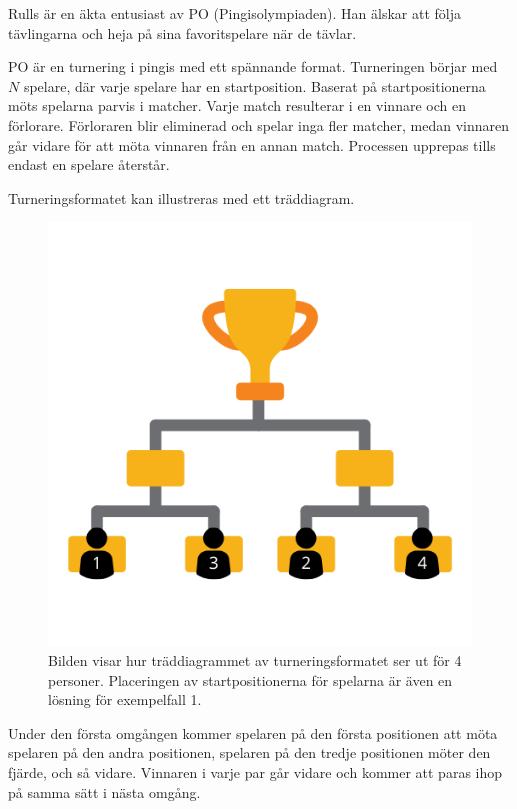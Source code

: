 \noindent

Rulls är en äkta entusiast av PO (Pingisolympiaden).  
Han älskar att följa tävlingarna och heja på sina favoritspelare när de tävlar.

PO är en turnering i pingis med ett spännande format.  
Turneringen börjar med $N$ spelare, där varje spelare har en startposition.  
Baserat på startpositionerna möts spelarna parvis i matcher.  
Varje match resulterar i en vinnare och en förlorare.  
Förloraren blir eliminerad och spelar inga fler matcher,  
medan vinnaren går vidare för att möta vinnaren från en annan match.  
Processen upprepas tills endast en spelare återstår.

Turneringsformatet kan illustreras med ett träddiagram.

\begin{centering}
  \begin{figure}[h]
      \centering
      \includegraphics[scale=0.7]{2.png}
    \caption{Bilden visar hur träddiagrammet av turneringsformatet ser ut för 4 personer. Placeringen av startpositionerna för spelarna är även en lösning för exempelfall 1.}
  \end{figure}
\end{centering}

Under den första omgången kommer spelaren på den första positionen att möta spelaren på den andra positionen, 
spelaren på den tredje positionen möter den fjärde, och så vidare. Vinnaren i varje par går vidare och kommer att paras ihop på samma sätt i nästa omgång.

